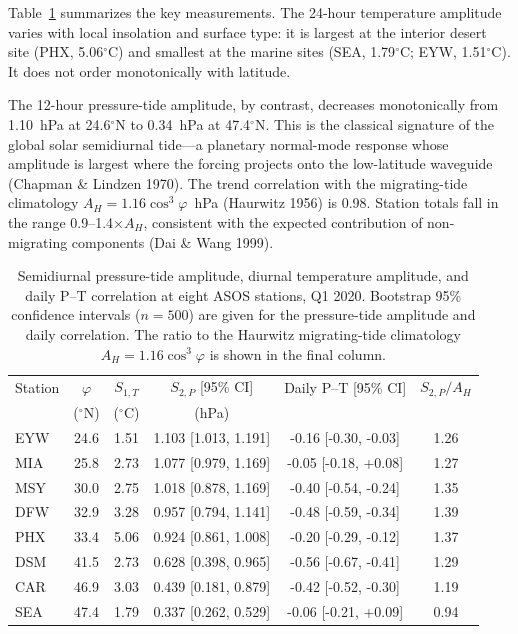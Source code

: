 \documentclass[11pt]{article}
\begin{document}
Table~\ref{tab:asos} summarizes the key measurements. The 24-hour temperature amplitude varies with local insolation and surface type: it is largest at the interior desert site (PHX, 5.06$^\circ$C) and smallest at the marine sites (SEA, 1.79$^\circ$C; EYW, 1.51$^\circ$C). It does not order monotonically with latitude.

The 12-hour pressure-tide amplitude, by contrast, decreases monotonically from 1.10~hPa at 24.6$^\circ$N to 0.34~hPa at 47.4$^\circ$N. This is the classical signature of the global solar semidiurnal tide---a planetary normal-mode response whose amplitude is largest where the forcing projects onto the low-latitude waveguide (Chapman \& Lindzen 1970). The trend correlation with the migrating-tide climatology $A_H = 1.16\cos^3\varphi$~hPa (Haurwitz 1956) is 0.98. Station totals fall in the range 0.9--1.4$\times A_H$, consistent with the expected contribution of non-migrating components (Dai \& Wang 1999).

\begin{table}[t]
\centering
\caption{Semidiurnal pressure-tide amplitude, diurnal temperature amplitude, and daily P--T correlation at eight ASOS stations, Q1 2020. Bootstrap 95\% confidence intervals ($n=500$) are given for the pressure-tide amplitude and daily correlation. The ratio to the Haurwitz migrating-tide climatology $A_H = 1.16\cos^3\varphi$ is shown in the final column.}
\label{tab:asos}
\begin{tabular}{lccccc}
\toprule
Station & $\varphi$ & $S_{1,T}$ & $S_{2,P}$ [95\% CI] &
Daily P--T [95\% CI] & $S_{2,P}/A_H$ \\
 & ($^\circ$N) & ($^\circ$C) & (hPa) & & \\
\midrule
EYW & 24.6 & 1.51 & 1.103 [1.013, 1.191] & -0.16 [-0.30, -0.03] & 1.26 \\
MIA & 25.8 & 2.73 & 1.077 [0.979, 1.169] & -0.05 [-0.18, +0.08] & 1.27 \\
MSY & 30.0 & 2.75 & 1.018 [0.878, 1.169] & -0.40 [-0.54, -0.24] & 1.35 \\
DFW & 32.9 & 3.28 & 0.957 [0.794, 1.141] & -0.48 [-0.59, -0.34] & 1.39 \\
PHX & 33.4 & 5.06 & 0.924 [0.861, 1.008] & -0.20 [-0.29, -0.12] & 1.37 \\
DSM & 41.5 & 2.73 & 0.628 [0.398, 0.965] & -0.56 [-0.67, -0.41] & 1.29 \\
CAR & 46.9 & 3.03 & 0.439 [0.181, 0.879] & -0.42 [-0.52, -0.30] & 1.19 \\
SEA & 47.4 & 1.79 & 0.337 [0.262, 0.529] & -0.06 [-0.21, +0.09] & 0.94 \\
\bottomrule
\end{tabular}
\end{table}
\end{document}
